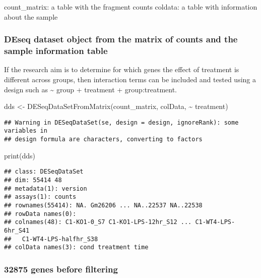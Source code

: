 \documentclass[
]{article}
\newenvironment{Shaded}{\begin{snugshade}}{\end{snugshade}}
\newcommand{\FunctionTok}[1]{\textcolor[rgb]{0.00,0.00,0.00}{#1}}
\newcommand{\NormalTok}[1]{#1}
\newcommand{\OtherTok}[1]{\textcolor[rgb]{0.56,0.35,0.01}{#1}}
\newcommand{\SpecialCharTok}[1]{\textcolor[rgb]{0.00,0.00,0.00}{#1}}
\begin{document}
count\_matrix: a table with the fragment counts coldata: a table with
information about the sample

\hypertarget{deseq-dataset-object-from-the-matrix-of-counts-and-the-sample-information-table}{%
\subsubsection{DEseq dataset object from the matrix of counts and the
sample information
table}\label{deseq-dataset-object-from-the-matrix-of-counts-and-the-sample-information-table}}

If the research aim is to determine for which genes the effect of
treatment is different across groups, then interaction terms can be
included and tested using a design such as \textasciitilde{} group +
treatment + group:treatment.

\begin{Shaded}
\begin{Highlighting}[]
\NormalTok{dds }\OtherTok{\textless{}{-}} \FunctionTok{DESeqDataSetFromMatrix}\NormalTok{(count\_matrix, colData, }\SpecialCharTok{\textasciitilde{}}\NormalTok{ treatment)}
\end{Highlighting}
\end{Shaded}

\begin{verbatim}
## Warning in DESeqDataSet(se, design = design, ignoreRank): some variables in
## design formula are characters, converting to factors
\end{verbatim}

\begin{Shaded}
\begin{Highlighting}[]
\FunctionTok{print}\NormalTok{(dds)}
\end{Highlighting}
\end{Shaded}

\begin{verbatim}
## class: DESeqDataSet 
## dim: 55414 48 
## metadata(1): version
## assays(1): counts
## rownames(55414): NA. Gm26206 ... NA..22537 NA..22538
## rowData names(0):
## colnames(48): C1-KO1-0_S7 C1-KO1-LPS-12hr_S12 ... C1-WT4-LPS-6hr_S41
##   C1-WT4-LPS-halfhr_S38
## colData names(3): cond treatment time
\end{verbatim}

\hypertarget{genes-before-filtering}{%
\subsubsection{32875 genes before
filtering}\label{genes-before-filtering}}
\end{document}
